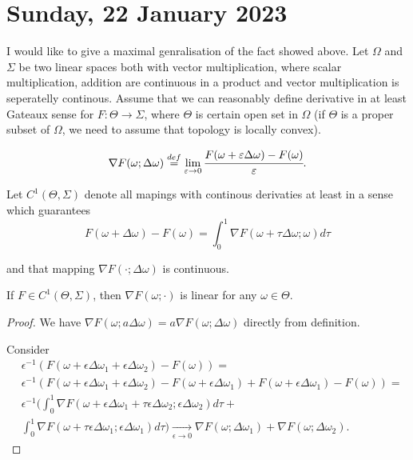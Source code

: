 \documentclass[main.tex]{subfiles}
\begin{document}
\section{Sunday, 22 January 2023}

I would like to give a maximal genralisation of the fact showed above.
Let $\Omega$ and $\Sigma$ be two linear spaces both with vector multiplication, where  scalar multiplication, addition are continuous in a product and vector multiplication is seperatelly continous. Assume that we can reasonably define derivative in at least Gateaux sense for $F: \Theta\to\Sigma$, where $\Theta$ is certain open set in $\Omega$ (if $\Theta$ is a proper subset of $\Omega$, we need to assume that topology is locally convex).

\begin{equation}
\nabla F(\omega; \Delta\omega) \stackrel{def}{=} \lim_{\epsilon\to 0}\cfrac{F(\omega + \epsilon\Delta\omega) - F(\omega)}{\epsilon}.
\end{equation}

Let $C^1(\Theta,\Sigma)$ denote all mapings with continous derivaties at least in a sense which guarantees
\begin{equation}
F(\omega + \Delta \omega) - F(\omega) = \int_0^1 \nabla F (\omega + \tau\Delta\omega; \omega) d\tau
\end{equation}

and that mapping $\nabla F(\cdot; \Delta\omega)$ is continuous.

\begin{lemma} If $F\in C^1(\Theta,\Sigma)$, then
$\nabla F(\omega; \cdot)$ is linear for any $\omega\in\Theta$.
\end{lemma}
\begin{proof}
We have $\nabla F(\omega; a\Delta\omega) = a \nabla F(\omega; \Delta\omega)$ directly from definition.

Consider 
\begin{align*}
& \epsilon^{-1}(F(\omega + \epsilon\Delta\omega_1 + \epsilon\Delta\omega_2) - F(\omega)) = \\
& \epsilon^{-1}(F(\omega + \epsilon\Delta\omega_1 + \epsilon\Delta\omega_2) - F(\omega + \epsilon\Delta\omega_1) + F(\omega + \epsilon\Delta\omega_1) - F(\omega)) = \\
& \epsilon^{-1} \bigg(\int_0^1 \nabla F (\omega + \epsilon\Delta\omega_1 + \tau\epsilon \Delta\omega_2; \epsilon\Delta \omega_2) d\tau + \\
& \int_0^1 \nabla F (\omega + \tau\epsilon\Delta\omega_1; \epsilon\Delta \omega_1) d\tau\bigg) \xrightarrow[\epsilon \to 0]{} \nabla F (\omega; \Delta \omega_1) + \nabla F (\omega; \Delta \omega_2).
\end{align*}
\end{proof}
\end{document}
